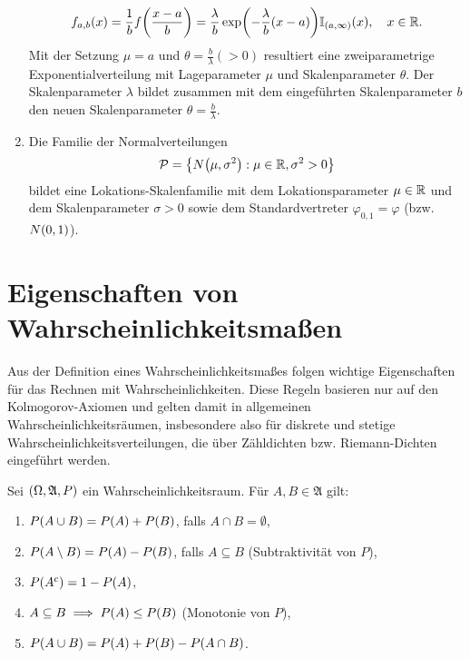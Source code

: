 \documentclass{lecture}
\begin{document}
\begin{example}
\begin{enumerate}
            \[
                f_{a, b}\parentheses*{x} = \frac{1}{b}f\parentheses*{\frac{x - a}{b}} = \frac{\lambda}{b}\exp\parentheses*{-\frac{\lambda}{b}\parentheses*{x - a}}\mathbb{I}_{\parentheses*{a, \infty}}\parentheses*{x}, \quad x \in \R.
            \]
            Mit der Setzung \(\mu = a\) und \(\theta = \frac{b}{\lambda} (> 0)\) resultiert eine zweiparametrige Exponentialverteilung mit Lageparameter \(\mu\) und Skalenparameter \(\theta\).
            Der Skalenparameter \(\lambda\) bildet zusammen mit dem eingeführten Skalenparameter \(b\) den neuen Skalenparameter \(\theta = \frac{b}{\lambda}\).
            \item Die Familie der Normalverteilungen
            \[
                \mathcal{P} = \braces*{N\parentheses*{\mu, \sigma^2} : \mu \in \R, \sigma^2 > 0}
            \]
            bildet eine Lokations-Skalenfamilie mit dem Lokationsparameter \(\mu \in \R\) und dem Skalenparameter \(\sigma > 0\) sowie dem Standardvertreter \(\varphi_{0, 1} = \varphi\) (bzw. \(N\parentheses*{0, 1}\)).
        \end{enumerate}
    \end{example}


    \section*{Eigenschaften von Wahrscheinlichkeitsmaßen}

    Aus der Definition eines Wahrscheinlichkeitsmaßes folgen wichtige Eigenschaften für das Rechnen mit Wahrscheinlichkeiten.
    Diese Regeln basieren nur auf den Kolmogorov-Axiomen und gelten damit in allgemeinen Wahrscheinlichkeitsräumen, insbesondere also für diskrete und stetige Wahrscheinlichkeitsverteilungen, die über Zähldichten bzw. Riemann-Dichten eingeführt werden.

    \begin{lemma}
        Sei \(\parentheses*{\Omega, \mathfrak{A}, P}\) ein Wahrscheinlichkeitsraum.
        Für \(A, B \in \mathfrak{A}\) gilt:
        \begin{enumerate}
            \item \(P\parentheses*{A \cup B} = P\parentheses*{A} + P\parentheses*{B}\), falls \(A \cap B = \emptyset\),
            \item \(P\parentheses*{A \setminus B} = P\parentheses*{A} - P\parentheses*{B}\), falls \(A \subseteq B\) (Subtraktivität von \(P\)),
            \item \(P\parentheses*{A^c} = 1 - P\parentheses*{A}\),
            \item \(A \subseteq B \implies P\parentheses*{A} \le P\parentheses*{B}\) (Monotonie von \(P\)),
            \item \(P\parentheses*{A \cup B} = P\parentheses*{A} + P\parentheses*{B} - P\parentheses*{A \cap B}\).
        \end{enumerate}
    \end{lemma}
\end{document}
